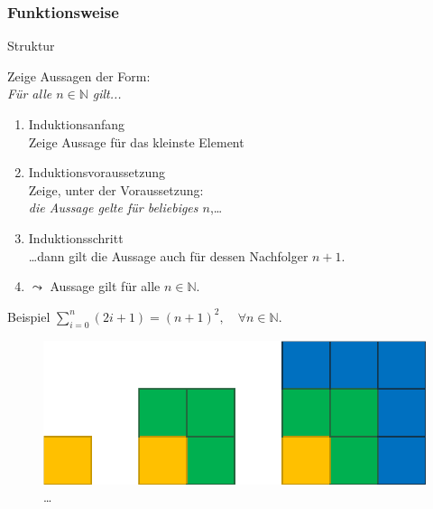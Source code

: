 \subsubsection{Funktionsweise}
\begin{frame}[fragile]{Struktur}
    \begin{alertblock}{Zeige Aussagen der Form:\\\emph{Für alle $n\in\mathbb{N}$ gilt...}}
    \begin{enumerate}
        \item \alert{Induktionsanfang}\\Zeige Aussage für das kleinste Element
        \item \alert{Induktionsvoraussetzung}\\Zeige, unter der Voraussetzung: \\\emph{die Aussage gelte für beliebiges $n$},\dots
        \item \alert{Induktionsschritt}\\\dots dann gilt die Aussage auch für dessen Nachfolger $n+1$.
        \item $\leadsto$ Aussage gilt für alle $n \in \mathbb{N}$.
    \end{enumerate}
    \end{alertblock}
\end{frame}

\begin{frame}[fragile]{Beispiel}
\center $\displaystyle\sum_{i = 0}^{n} (2i+1) = (n+1)^2,\quad\forall n \in\mathbb{N}$.
    \begin{figure}
        \centering
        \includegraphics[width=0.5\textheight]{../figures/Summe.png}\qquad \dots
    \end{figure}
\end{frame}

